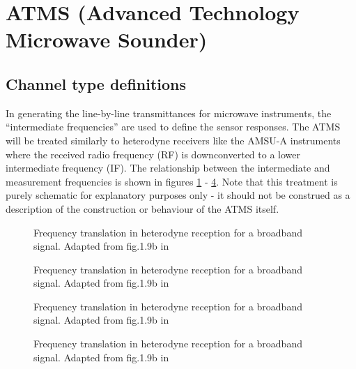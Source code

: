 \section{ATMS (Advanced Technology Microwave Sounder)}

\subsection{Channel type definitions}
In generating the line-by-line transmittances for microwave instruments, the ``intermediate frequencies'' are used to define the sensor responses. The ATMS will be treated similarly to heterodyne receivers like the AMSU-A instruments where the received radio frequency (RF) is downconverted to a lower intermediate frequency (IF). The relationship between the intermediate and measurement frequencies is shown in figures \ref{fig:broadband_frequency_translation} - \ref{fig:broadband_frequency_translation_4}. Note that this treatment is purely schematic for explanatory purposes only - it should not be construed as a description of the construction or behaviour of the ATMS itself.
\begin{figure}[htp]
  \centering
  
  \caption{Frequency translation in heterodyne reception for a broadband signal. Adapted from fig.1.9b in \citet{Janssen_1993}}
  \label{fig:broadband_frequency_translation}
\end{figure}

\begin{figure}[htp]
  \centering
  
  \caption{Frequency translation in heterodyne reception for a broadband signal. Adapted from fig.1.9b in \citet{Janssen_1993}}
  \label{fig:broadband_frequency_translation_2}
\end{figure}

\newpage

\begin{figure}[htp]
  \centering
  
  \caption{Frequency translation in heterodyne reception for a broadband signal. Adapted from fig.1.9b in \citet{Janssen_1993}}
  \label{fig:broadband_frequency_translation_3}
\end{figure}

\begin{figure}[htp]
  \centering
  
  \caption{Frequency translation in heterodyne reception for a broadband signal. Adapted from fig.1.9b in \citet{Janssen_1993}}
  \label{fig:broadband_frequency_translation_4}
\end{figure}

